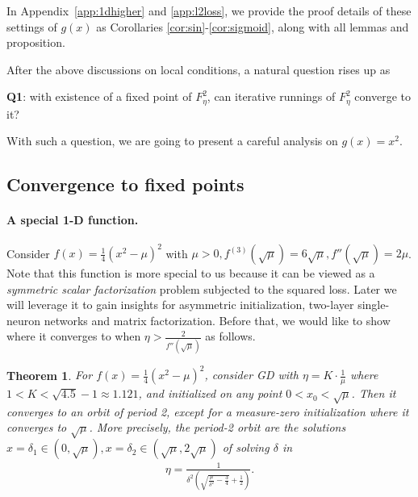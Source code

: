 \documentclass{article}
\theoremstyle{plain}
\newtheorem{theorem}{Theorem}
\theoremstyle{remark}
\newcommand{\T}[1]{^{(#1)}}
\begin{document}


In Appendix~\ref{app:1dhigher} and \ref{app:l2loss}, we provide the proof details of these settings of $g(x)$ as Corollaries \ref{cor:sin}-\ref{cor:sigmoid}, along with all lemmas and proposition.


After the above discussions on local conditions, a natural question rises up as 
\begin{center}
    \textbf{Q1}: with existence of a fixed point of $F^2_\eta$, can iterative runnings of $F^2_\eta$ converge to it?
\end{center}

With such a question, we are going to present a careful analysis on $g(x)=x^2$.

\subsection{Convergence to fixed points}\label{sec:convergence}

\paragraph{A special 1-D function.}

Consider $f(x)=\frac{1}{4}(x^2-\mu)^2$ with $\mu>0, f\T{3}(\sqrt{\mu})=6\sqrt{\mu}, f''(\sqrt{\mu})=2\mu$. Note that this function is more special to us because it can be viewed as a \textit{symmetric scalar factorization} problem subjected to the squared loss. Later we will leverage it to gain insights for asymmetric initialization, two-layer single-neuron networks and matrix factorization. Before that, we would like to show where it converges to when $\eta>\frac{2}{f''(\sqrt{\mu})}$ as follows.

\begin{theorem}
For $f(x)=\frac{1}{4}(x^2-\mu)^2$, consider GD with $\eta=K\cdot\frac{1}{\mu}$ where $1<K <\sqrt{4.5}-1\approx 1.121$, and initialized on any point $0<x_0<\sqrt{\mu}$. Then it converges to an orbit of period 2, except for a measure-zero initialization where it converges to $\sqrt{\mu}$. More precisely, the period-2 orbit are the solutions $x=\delta_1\in(0,\sqrt{\mu}), x=\delta_2\in(\sqrt{\mu},2\sqrt{\mu})$ of solving $\delta$ in
\begin{align}
    \eta  = \frac{1}{\delta^2\left( \sqrt{\frac{\mu}{\delta^2}-\frac{3}{4}} +\frac{1}{2}\right)}.
    \label{eq:1d_orbit}
\end{align}
\label{thm:1dglobal}
\end{theorem}
\end{document}
